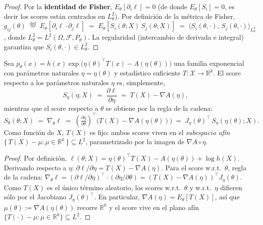 \begin{proof}
	Por la \textbf{identidad de Fisher}, $E_\theta[\partial_i \ell] = 0$
	(de donde $E_\theta[S_i] = 0$, es decir los scores están centrados en
	$L^2_\theta$).  Por definición de la métrica de Fisher,
	$g_{ij}(\theta) \;\stackrel{\text{def}}{=}\;
	E_\theta\!\left[\partial_i \ell \cdot \partial_j \ell\right]
	\;=\; E_\theta\!\left[S_i(\theta; X)\, S_j(\theta; X)\right]
	\;=\; \langle S_i(\theta, \cdot),\, S_j(\theta, \cdot) \rangle_{L^2_\theta}$,
	donde $L^2_\theta = L^2(\Omega, \mathcal{F}, P_\theta)$.  La regularidad
	(intercambio de derivada e integral) garantiza que $S_i(\theta, \cdot) \in
	L^2_\theta$.
\end{proof}

\begin{proposition}
	\label{prop:exp-fam-score}
	Sea $p_\theta(x) = h(x) \exp\bigl(\eta(\theta)^\top T(x) - A(\eta(\theta))\bigr)$
	una familia exponencial con parámetros naturales $\eta = \eta(\theta)$ y
	estadístico suficiente $T : \mathcal{X} \to \mathbb{R}^k$.  El score respecto
	a los parámetros naturales $\eta$ es, simplemente,
	\[
	S_\eta(\eta; X) \;=\; \frac{\partial \ell}{\partial \eta}
	\;=\; T(X) - \nabla A(\eta),
	\]
	mientras que el score respecto a $\theta$ se obtiene por la regla de la
	cadena:
	\[
	S_\theta(\theta; X) \;=\; \nabla_\theta \ell
	\;=\; \left(\tfrac{\partial \eta}{\partial \theta}\right)^\top\!
	\bigl(T(X) - \nabla A(\eta(\theta))\bigr)
	\;=\; J_\eta(\theta)^\top\, S_\eta(\eta(\theta); X).
	\]
	Como función de $X$, $T(X)$ es fijo: ambos scores viven en el
	\emph{subespacio afín} $\{\,T(X) - \mu : \mu \in \mathbb{R}^k\,\}
	\subseteq L^2$, parametrizado por la imagen de $\nabla A \circ \eta$.
\end{proposition}

\begin{proof}
	Por definición, $\ell(\theta; X) = \eta(\theta)^\top T(X) - A(\eta(\theta))
	+ \log h(X)$.  Derivando respecto a $\eta$:
	$\partial \ell / \partial \eta = T(X) - \nabla A(\eta)$.  Para el score
	w.r.t.\ $\theta$, regla de la cadena:
	$\nabla_\theta \ell
	= (\partial \ell / \partial \eta)^\top \cdot (\partial \eta / \partial \theta)
	= (T(X) - \nabla A(\eta))^\top J_\eta(\theta)$.  Como $T(X)$ es el único
	término aleatorio, los scores w.r.t.\ $\theta$ y w.r.t.\ $\eta$ difieren
	sólo por el Jacobiano $J_\eta(\theta)^\top$.  En particular,
	$\nabla A(\eta) = E_\theta[T(X)]$, así que $\mu(\theta) := \nabla A(\eta(\theta))$
	recorre $\mathbb{R}^k$ y el score vive en el plano afín
	$\{T(\cdot) - \mu : \mu \in \mathbb{R}^k\} \subseteq L^2$.
\end{proof}

